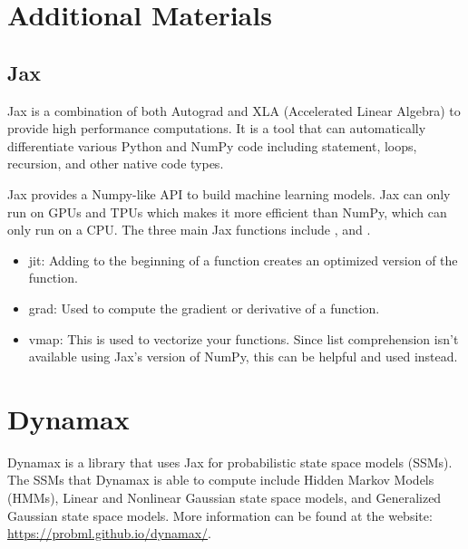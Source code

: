 
\pagebreak

\section*{Additional Materials}

\subsection*{Jax}
Jax is a combination of both Autograd and XLA (Accelerated Linear Algebra) to provide high performance computations. It is a tool that can automatically differentiate various Python and NumPy code including  statement,  loops, recursion, and other native code types.

 Jax provides a Numpy-like API to build machine learning models. Jax can only run on GPUs and TPUs which makes it more efficient than NumPy, which can only run on a CPU. The three main Jax functions include ,  and . 
 
\begin{itemize}
 \item jit: Adding   to the beginning of a function creates an optimized version of the function.
\item grad: Used to compute the gradient or derivative of a function.
\item vmap: This is used to vectorize your functions. Since list comprehension isn't available using Jax's version of NumPy, this can be helpful and used instead. 
\end{itemize}

\section*{Dynamax}
Dynamax is a library that uses Jax for probabilistic state space models (SSMs).
The SSMs that Dynamax is able to compute include Hidden Markov Models (HMMs), Linear and Nonlinear Gaussian state space models, and Generalized Gaussian state space models.
More information can be found at the website: \url{https://probml.github.io/dynamax/}.

 
 